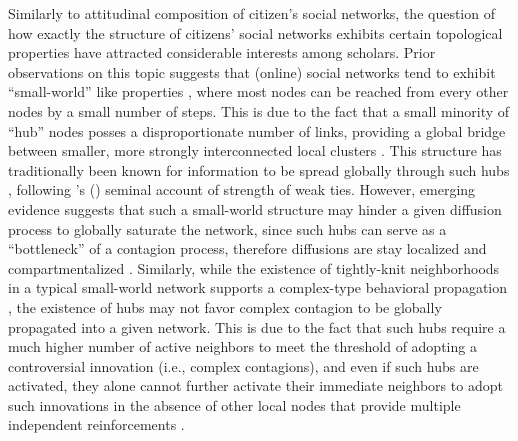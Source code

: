 \documentclass[man, 12pt, a4paper, nolmodern, noextraspace]{apa6}
\begin{document}
    Similarly to attitudinal composition of citizen's social networks, the question of how exactly the structure of citizens' social networks exhibits certain topological properties have attracted considerable interests among scholars. Prior observations on this topic suggests that (online) social networks tend to exhibit \enquote{small-world} like properties \parencite{kumar2010structure, ugander2011anatomy}, where most nodes can be reached from every other nodes by a small number of steps. This is due to the fact that a small minority of \enquote{hub} nodes posses a disproportionate number of links, providing a global bridge between smaller, more strongly interconnected local clusters \parencite{barabasi2004linked}. This structure has traditionally been known for information to be spread globally through such hubs \parencite[e.g.,][]{Bakshy_2012}, following \citeauthor{granovetter1977strength}'s (\citeyear{granovetter1977strength}) seminal account of strength of weak ties. However, emerging evidence suggests that such a small-world structure may hinder a given diffusion process to globally saturate the network, since such hubs can serve as a \enquote{bottleneck} of a contagion process, therefore diffusions are stay localized and compartmentalized \parencite[e.g.,][]{gonzalez2017decoding, centola2007complex, zhao2010weak}. Similarly, while the existence of tightly-knit neighborhoods in a typical small-world network supports a complex-type behavioral propagation \parencite[i.e., an innovation that runs counter to prevalent norms and values:][]{Centola2010Sience}, the existence of hubs may not favor complex contagion to be globally propagated into a given network. This is due to the fact that such hubs require a much higher number of active neighbors to meet the threshold of adopting a controversial innovation (i.e., complex contagions), and even if such hubs are activated, they alone cannot further activate their immediate neighbors to adopt such  innovations in the absence of other local nodes that provide multiple independent reinforcements \parencite{Centola2007449, zhao2010weak, gonzalez2017decoding}. 
    
\end{document}
